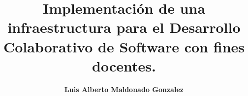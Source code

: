 \documentclass[12pt,letterpaper]{report}
\begin{document}
\renewcommand{\listtablename}{Índice de tablas}
\renewcommand{\tablename}{Tabla}
    \title{\textbf{Implementación de una infraestructura para el Desarrollo Colaborativo de Software con fines docentes.}}
    \author{\textbf{Luis Alberto Maldonado Gonzalez}}



\beforepreface

\newpage
\afterpreface








%
%
%



\end{document}
